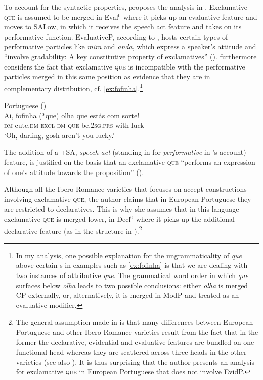  To account for the syntactic properties, \citet{Corr2016} proposes the analysis in .
Exclamative \textsc{que} is assumed to be merged in Eval$^0$ where it picks up an evaluative feature and moves to SALow, in which it receives the speech act feature and takes on its performative function. EvaluativeP, according to \citet{Corr2016}, hosts certain types of performative particles like \emph{mira} and \emph{anda}, which express a speaker's attitude and ``involve gradability: A key constitutive property of exclamatives'' (\citealt[136]{Corr2016}).  \citet{Corr2016} furthermore considers the fact that exclamative \textsc{que} is incompatible with the performative particles  merged in this same position as evidence  that they are in complementary distribution, cf. \eqref{ex:fofinha}.\footnote{In my analysis, one possible explanation for the ungrammaticality of \emph{que} above certain s in examples such as \eqref{ex:fofinha}  is that we are dealing with two instances of attributive  \emph{que}. The grammatical word order in which \emph{que} surfaces below \emph{olha}  leads to two possible conclusions: either  \emph{olha} is merged CP-externally, or, alternatively, it is merged in ModP and treated as an evaluative modifier.}



\ea\label{ex:fofinha}
Portuguese (\citealt[137: ex 132]{Corr2016})\\ 
\gll Ai, fofinha (*que) olha que estás com sorte! \\
\textsc{dm} cute.\textsc{dm} \textsc{excl} \textsc{dm} \textsc{que} be.\textsc{2sg.prs} with luck\\
\glt `Oh, darling, gosh aren't you lucky.' 
\z

The addition of a +SA, \emph{speech act} (standing in for \emph{performative} in \citeauthor{Corr2016}'s \citeyear{Corr2016} account) feature, is justified on the basis that an exclamative \textsc{que} ``performs an expression of one's attitude towards the proposition'' (\citealt[108]{Corr2016}).\largerpage[-2]


Although all the Ibero-Romance varieties that \citet{Corr2016} focuses on accept constructions involving exclamative \textsc{que}, the author claims that  in European Portuguese they are restricted to declaratives. This is why she assumes that in this language exclamative \textsc{que} is  merged lower, in Decl$^0$ where it picks up the additional declarative feature (as in the structure in ).{\footnote{The general assumption made in \citet{Corr2016} is that many differences between European Portuguese and other Ibero-Romance varieties result from the fact that in the former  the declarative, evidential and evaluative  features are bundled on one functional head whereas they are scattered across three heads in the other varieties (see also ). It is thus surprising that the author presents an analysis for exclamative \textsc{que}  in European Portuguese that does not involve EvidP.}}\largerpage

